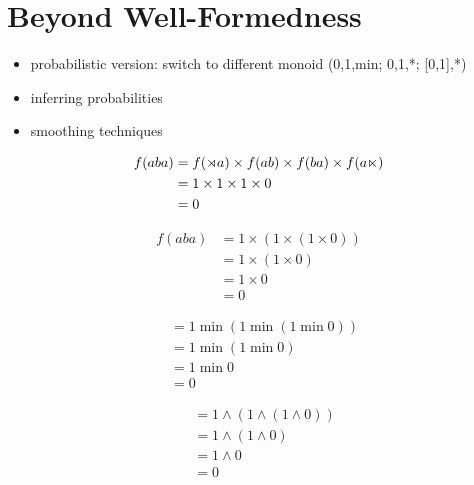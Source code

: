 \chapter{Beyond Well-Formedness}
\label{cha:PSL}

\begin{itemize}
    \item probabilistic version: switch to different monoid (0,1,min; 0,1,*; [0,1],*)
    \item inferring probabilities
    \item smoothing techniques
\end{itemize}

\begin{align*}
    f(aba) & =
            f(\rtimes a)
            \times
            f(ab)
            \times
            f(ba)
            \times
            f(a\ltimes)
            \\
            & =
            1
            \times
            1
            \times
            1
            \times
            0
            \\
            & =
            0
\end{align*}

\begin{center}
    \begin{minipage}{.35\linewidth}
        \begin{align*}
            f(aba)
            &= 1 \times (1 \times (1 \times 0)) \\
            &= 1 \times (1 \times 0) \\
            &= 1 \times 0\\
            &= 0
        \end{align*}
    \end{minipage}
    \begin{minipage}{.2\linewidth}
        \begin{align*}
            &= 1 \mathrel{\text{min}} (1 \mathrel{\text{min}} (1 \mathrel{\text{min}} 0)) \\
            &= 1 \mathrel{\text{min}} (1 \mathrel{\text{min}} 0) \\
            &= 1 \mathrel{\text{min}} 0\\
            &= 0
        \end{align*}
    \end{minipage}
    \begin{minipage}{.25\linewidth}
        \begin{align*}
            &= 1 \wedge (1 \wedge (1 \wedge 0)) \\
            &= 1 \wedge (1 \wedge 0) \\
            &= 1 \wedge 0\\
            &= 0
        \end{align*}
    \end{minipage}
\end{center}

